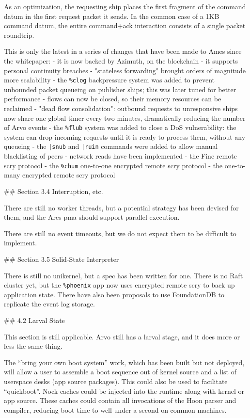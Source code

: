 \documentclass[twoside]{article}
\begin{document}
As an optimization, the requesting ship places the first fragment of the command datum in the first request packet it sends.  In the common case of a 1KB command datum, the entire command+ack interaction consists of a single packet roundtrip.

This is only the latest in a series of changes that have been made to Ames since the whitepaper:
- it is now backed by Azimuth, on the blockchain
- it supports personal continuity breaches
- "stateless forwarding" brought orders of magnitude more scalability
- the \lstinline[style=inlinecode]{%clog} backpressure system was added to prevent unbounded packet queueing on publisher ships; this was later tuned for better performance
- flows can now be closed, so their memory resources can be reclaimed
- "dead flow consolidation": outbound requests to unresponsive ships now share one global timer every two minutes, dramatically reducing the number of Arvo events
- the \lstinline[style=inlinecode]{%flub} system was added to close a DoS vulnerability: the system can drop incoming requests until it is ready to process them, without any queueing
- the \lstinline[style=inlinecode]{|snub} and \lstinline[style=inlinecode]{|ruin} commands were added to allow manual blacklisting of peers
- network reads have been implemented
  - the Fine remote scry protocol
  - the \lstinline[style=inlinecode]{%chum} one-to-one encrypted remote scry protocol
  - the one-to-many encrypted remote scry protocol

## Section 3.4 Interruption, etc.

There are still no worker threads, but a potential strategy has been devised for them, and the Ares {\sc pma} should support parallel execution.

There are still no event timeouts, but we do not expect them to be difficult to implement.

## Section 3.5 Solid-State Interpreter

There is still no unikernel, but a spec has been written for one.  There is no Raft cluster yet, but the \lstinline[style=inlinecode]{%phoenix} app now uses encrypted remote scry to back up application state.  There have also been proposals to use FoundationDB to replicate the event log storage.

## 4.2 Larval State

This section is still applicable.  Arvo still has a larval stage, and it does more or less the same thing.

The ``bring your own boot system'' work, which has been built but not deployed, will allow a user to assemble a boot sequence out of kernel source and a list of userspace desks (app source packages).  This could also be used to facilitate ``quickboot''.  Nock caches could be injected into the runtime along with kernel or app source.  These caches could contain all invocations of the Hoon parser and compiler, reducing boot time to well under a second on common machines.
\end{document}
